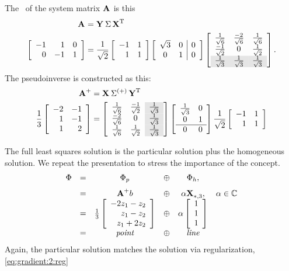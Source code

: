 The \svdl \ of the system matrix $\textbf{A}^{\mathrm{}}$ is this
\begin{equation}
  \begin{split}
    \svda{T}\\
    \mat{rrr}{-1&1&0\\0&-1&1}&=
    \stwo\mat{rr}{-1&1\\1&1}
    \mat{cc|c}{\sqrt{3}&0&0\\0&1&0}
    \mat{ccc}{
    \ssix&\frac{-2}{\sqrt{6}}&\ssix\\
    \frac{-1}{\sqrt{2}}&0&\stwo\\
    \rowcolor{ltgray}
     \sthree&\sthree&\sthree
    }.
  \end{split}
\end{equation}
The pseudoinverse is constructed as this:
\begin{equation}
  \begin{split}
    \mpgia{T}\\
    \frac{1}{3}
    \mat{rr}{-2&-1\\1&-1\\1&2} &=
    \mat{cc>{\columncolor{ltgray}}c}
   {\ssix & \frac{-1}{\sqrt{2}} & \sthree\\
    \frac{-2}{\sqrt{6}} & 0     & \sthree\\
    \ssix    & \stwo            & \sthree}
    \mat{cc}{\sthree &0\\0&1\\\hline0&0}    
    \stwo\mat{rr}{-1&1\\1&1}
  \end{split}
\end{equation}

The full least squares solution is the particular solution plus the homogeneous solution.  We repeat the presentation to stress the importance of the concept.
\begin{equation}
  \begin{array}{rccccc}
    \Phi &=& \Phi_{p} &\oplus& \Phi_{h},\\[7pt]
      &=& \A{+}b &\oplus& \alpha \X{}_{*,3} , & \alpha \in \cmplx{}\\
      &=& \rthree\mat{r}{-2z_{1}-z_{2}\\z_{1}-z_{2}\\z_{1}+2z_{2}} &\oplus& \alpha \mat{c}{1\\1\\1}\\[4pt]
      &=& \textit{point} &\oplus& \textit{line}
  \end{array}
\label{eq:simple:fullsoln}
\end{equation}
Again, the particular solution matches the solution via regularization, \eqref{eq:gradient:2:reg}

